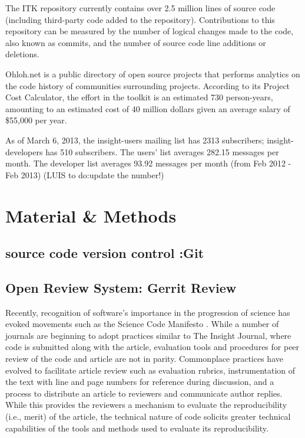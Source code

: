 \documentclass{frontiersENG} %
\begin{document}
The ITK repository currently contains over 2.5 million lines of source code (including third-party code added to the repository). Contributions to this repository can be measured by the number of logical changes made to the code, also known as commits, and the number of source code line additions or deletions.

Ohloh.net is a public directory of open source projects that performs analytics on the code history of communities surrounding projects. According to its Project Cost Calculator, the effort in the toolkit is an estimated 730 person-years, amounting to an estimated cost of 40 million dollars given an average salary of \$55,000 per year.

 As of March 6, 2013, the insight-users mailing list has 2313 subscribers; insight-developers has 510 subscribers. The users’ list averages 282.15 messages per month. The developer list averages 93.92 messages per month (from Feb 2012 - Feb 2013) (LUIS to do:update the number!)



\section{Material \& Methods}

\subsection{source code version control :Git}

\subsection{Open Review System: Gerrit Review}
Recently, recognition of software’s importance in the progression of science has evoked movements such as the Science Code Manifesto \cite{Barnes2010}. While a number of journals are beginning to adopt practices similar to The Insight Journal, where code is submitted along with the article, evaluation tools and procedures for peer review of the code and article are not in parity.  Commonplace practices have evolved to facilitate article review such as evaluation rubrics, instrumentation of the text with line and page numbers for reference during discussion, and a process to distribute an article to reviewers and communicate author replies.  While this provides the reviewers a mechanism to evaluate the reproducibility (i.e., merit) of the article, the technical nature of code solicits greater technical capabilities of the tools and methods used to evaluate its reproducibility.
\end{document}
